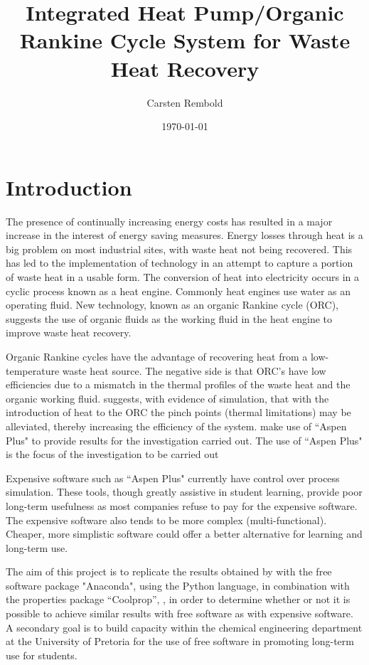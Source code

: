 \documentclass[a4paper,12pt]{article}
\title{Integrated Heat Pump/Organic Rankine Cycle System for Waste Heat Recovery}
\author{Carsten Rembold}
\date{\today}
\begin{document}


\section{Introduction}
The presence of continually increasing energy costs has resulted in a major increase in the interest of energy saving measures. Energy losses through heat is a big problem on most industrial sites, with waste heat not being recovered. This has led to the implementation of technology in an attempt to capture a portion of waste heat in a usable form. The conversion of heat into electricity occurs in a cyclic process known as a heat engine. Commonly heat engines use water as an operating fluid. New technology, known as an organic Rankine cycle (ORC), suggests the use of organic fluids as the working fluid in the heat engine to improve waste heat recovery. 

Organic Rankine cycles have the advantage of recovering heat from a low-temperature waste heat source. The negative side is that ORC's have low efficiencies due to a mismatch in the thermal profiles of the waste heat and the organic working fluid. \textcite{YU2018330} suggests, with evidence of simulation, that with the introduction of heat to the ORC the pinch points (thermal limitations) may be alleviated, thereby increasing the efficiency of the system. \textcite{YU2018330} make use of ``Aspen Plus" to provide results for the investigation carried out. The use of ``Aspen Plus" is the focus of the investigation to be carried out

Expensive software such as ``Aspen Plus" currently have control over process simulation. These tools, though greatly assistive in student learning, provide poor long-term usefulness as most companies refuse to pay for the expensive software. The expensive software also tends to be more complex (multi-functional). Cheaper, more simplistic software could offer a better alternative for learning and long-term use. 

The aim of this project is to replicate the results obtained by \textcite{YU2018330} with the free software package "Anaconda", using the Python language, in combination with the properties package ``Coolprop'', \parencite{Coolprop}, in order to determine whether or not it is possible to achieve similar results with free software as with expensive software. A secondary goal is to build capacity within the chemical engineering department at the University of Pretoria for the use of free software in promoting long-term use for students.
\end{document}
